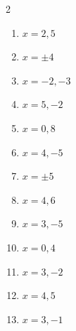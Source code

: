 \documentclass[11pt]{article}
\begin{document}
\begin{keybox}
\begin{multicols}{2}
\small
\begin{enumerate}[leftmargin=*,itemsep=3pt]
  \item $x=2,5$
  \item $x=\pm4$
  \item $x=-2,-3$
  \item $x=5,-2$
  \item $x=0,8$
  \item $x=4,-5$
  \item $x=\pm5$
  \item $x=4,6$
  \item $x=3,-5$
  \item $x=0,4$
  \item $x=3,-2$
  \item $x=4,5$
  \item $x=3,-1$
\end{enumerate}
\end{multicols}
\end{keybox}
\end{document}
